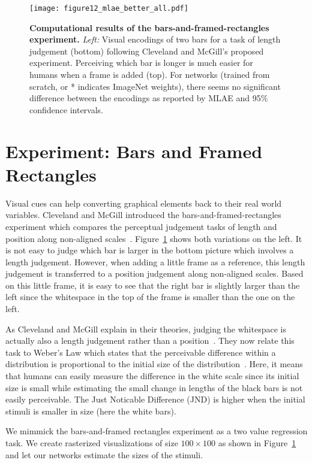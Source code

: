 \begin{figure}[!t]
	  \texttt{[image: figure12\_mlae\_better\_all.pdf]}
  \caption{\textbf{Computational results of the bars-and-framed-rectangles experiment.} \textit{Left:} Visual encodings of two bars for a task of length judgement (bottom) following Cleveland and McGill's proposed experiment. Perceiving which bar is longer is much easier for humans when a frame is added (top). For networks (trained from scratch, or * indicates ImageNet weights), there seems no significant difference between the encodings as reported by MLAE and 95\% confidence intervals.}
	\label{fig:figure12_mlae}
\end{figure}


\section{Experiment: Bars and Framed Rectangles}

Visual cues can help converting graphical elements back to their real world variables. Cleveland and McGill introduced the bars-and-framed-rectangles experiment which compares the perceptual judgement tasks  of length and position along non-aligned scales~\cite{cleveland_mcgill}. Figure~\ref{fig:figure12_mlae} shows both variations on the left. It is not easy to judge which bar is larger in the bottom picture which involves a length judgement. However, when adding a little frame as a reference, this length judgement is transferred to a position judgement along non-aligned scales. Based on this little frame, it is easy to see that the right bar is slightly larger than the left since the whitespace in the top of the frame is smaller than the one on the left. 

As Cleveland and McGill explain in their theories, judging the whitespace is actually also a length judgement rather than a position~\cite{cleveland_mcgill}. They now relate this task to Weber's Law which states that the perceivable difference within a distribution is proportional to the initial size of the distribution~\cite{householder1940weber}. Here, it means that humans can easily measure the difference in the white scale since its initial size is small while estimating the small change in lengths of the black bars is not easily perceivable. The Just Noticable Difference (JND) is higher when the initial stimuli is smaller in size (here the white bars).

We mimmick the bars-and-framed rectangles experiment as a two value regression task. We create rasterized visualizations of size $100\times100$ as shown in Figure~\ref{fig:figure12_mlae} and let our networks estimate the sizes of the stimuli.

